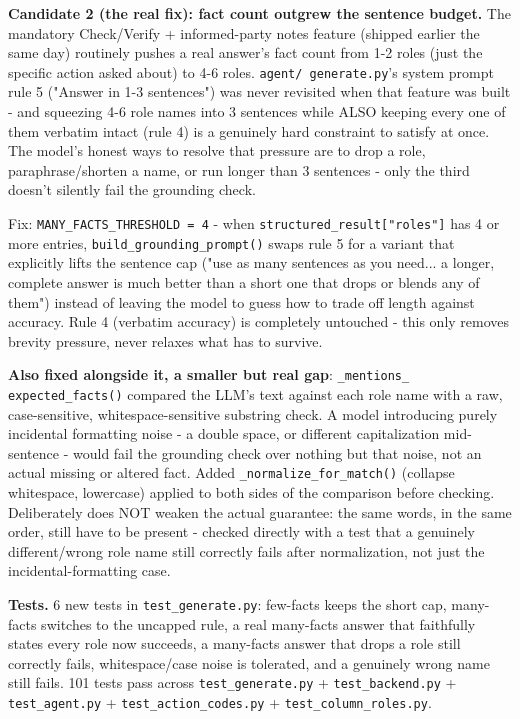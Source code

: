\textbf{Candidate 2 (the real fix): fact count outgrew the sentence budget.} The mandatory Check/Verify + informed-party notes feature (shipped earlier the same day) routinely pushes a real answer's fact count from 1-2 roles (just the specific action asked about) to 4-6 roles. \texttt{agent/\allowbreak{} generate.py}'s system prompt rule 5 ("Answer in 1-3 sentences") was never revisited when that feature was built - and squeezing 4-6 role names into 3 sentences while ALSO keeping every one of them verbatim intact (rule 4) is a genuinely hard constraint to satisfy at once. The model's honest ways to resolve that pressure are to drop a role, paraphrase/shorten a name, or run longer than 3 sentences - only the third doesn't silently fail the grounding check.

Fix: \texttt{MANY\_\allowbreak{}FACTS\_\allowbreak{}THRESHOLD = 4} - when \texttt{structured\_\allowbreak{}result["roles"]} has 4 or more entries, \texttt{build\_\allowbreak{}grounding\_\allowbreak{}prompt()} swaps rule 5 for a variant that explicitly lifts the sentence cap ("use as many sentences as you need... a longer, complete answer is much better than a short one that drops or blends any of them") instead of leaving the model to guess how to trade off length against accuracy. Rule 4 (verbatim accuracy) is completely untouched - this only removes brevity pressure, never relaxes what has to survive.

\textbf{Also fixed alongside it, a smaller but real gap}: \texttt{\_\allowbreak{}mentions\_\allowbreak{} expected\_\allowbreak{}facts()} compared the LLM's text against each role name with a raw, case-sensitive, whitespace-sensitive substring check. A model introducing purely incidental formatting noise - a double space, or different capitalization mid-sentence - would fail the grounding check over nothing but that noise, not an actual missing or altered fact. Added \texttt{\_\allowbreak{}normalize\_\allowbreak{}for\_\allowbreak{}match()} (collapse whitespace, lowercase) applied to both sides of the comparison before checking. Deliberately does NOT weaken the actual guarantee: the same words, in the same order, still have to be present - checked directly with a test that a genuinely different/wrong role name still correctly fails after normalization, not just the incidental-formatting case.

\textbf{Tests.} 6 new tests in \texttt{test\_\allowbreak{}generate.py}: few-facts keeps the short cap, many-facts switches to the uncapped rule, a real many-facts answer that faithfully states every role now succeeds, a many-facts answer that drops a role still correctly fails, whitespace/case noise is tolerated, and a genuinely wrong name still fails. 101 tests pass across \texttt{test\_\allowbreak{}generate.py} + \texttt{test\_\allowbreak{}backend.py} + \texttt{test\_\allowbreak{}agent.py} + \texttt{test\_\allowbreak{}action\_\allowbreak{}codes.py} + \texttt{test\_\allowbreak{}column\_\allowbreak{}roles.py}.

